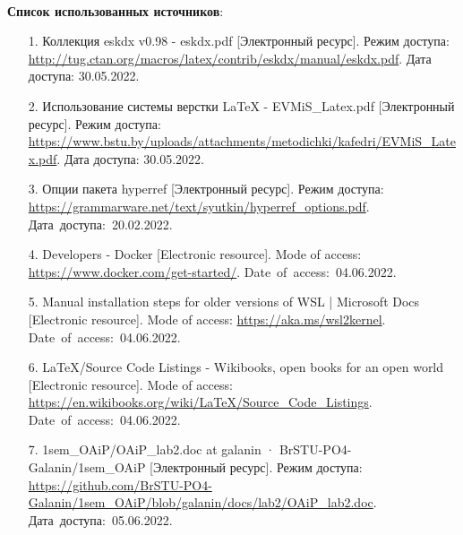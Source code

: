 \documentclass[12pt, a4paper, simple]{eskdtext}
\begin{document}
\paragraph{} \textbf{Список использованных источников}:
\begin{enumerate}
    \item[1.] Коллекция eskdx v0.98 - eskdx.pdf
    [Электронный ресурс].
    Режим доступа: \url{http://tug.ctan.org/macros/latex/contrib/eskdx/manual/eskdx.pdf}.
    Дата доступа: 30.05.2022.

    \item[2.] Использование системы верстки LaTeX - EVMiS\_Latex.pdf
    [Электронный ресурс].
    Режим доступа: \url{https://www.bstu.by/uploads/attachments/metodichki/kafedri/EVMiS_Latex.pdf}.
    Дата доступа: 30.05.2022.

    \item[3.] Опции пакета hyperref
    [Электронный ресурс].
    Режим доступа: \url{https://grammarware.net/text/syutkin/hyperref_options.pdf}.
    Дата~доступа:~20.02.2022.

    \item[4.] Developers - Docker
    [Electronic resource].
    Mode of access: \url{https://www.docker.com/get-started/}.
    Date~of~access:~04.06.2022.

    \item[5.] Manual installation steps for older versions of WSL | Microsoft Docs
    [Electronic resource].
    Mode of access: \url{https://aka.ms/wsl2kernel}.
    Date~of~access:~04.06.2022.

    \item[6.] LaTeX/Source Code Listings - Wikibooks, open books for an open world
    [Electronic resource].
    Mode of access: \url{https://en.wikibooks.org/wiki/LaTeX/Source_Code_Listings}.
    Date~of~access:~04.06.2022.

    \item[7.] 1sem\_OAiP/OAiP\_lab2.doc at galanin · BrSTU-PO4-Galanin/1sem\_OAiP
    [Электронный ресурс].
    Режим доступа: \url{https://github.com/BrSTU-PO4-Galanin/1sem_OAiP/blob/galanin/docs/lab2/OAiP_lab2.doc}.
    Дата~доступа:~05.06.2022.
\end{enumerate}

\newpage
\end{document}
